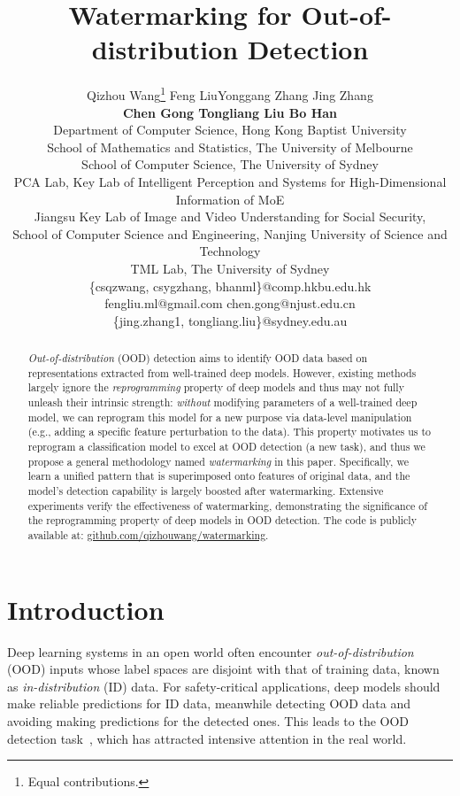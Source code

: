\documentclass{article}
\title{Watermarking for Out-of-distribution Detection}
\author{Qizhou Wang\thanks{Equal contributions.} \quad Feng Liu\footnotemark[1] \quad Yonggang Zhang \quad Jing Zhang \\ \textbf{Chen Gong \quad Tongliang Liu \quad Bo Han} \\
  Department of Computer Science, Hong Kong Baptist University \\
  School of Mathematics and Statistics, The University of Melbourne \\
  School of Computer Science, The University of Sydney \\
  PCA Lab, Key Lab of Intelligent Perception and Systems for High-Dimensional Information of MoE \\
  Jiangsu Key Lab of Image and Video Understanding for Social Security, \\
  School of Computer Science and Engineering, Nanjing University of Science and Technology\\
  TML Lab, The University of Sydney \\
  \textnormal{\{csqzwang, csygzhang, bhanml\}@comp.hkbu.edu.hk} \\ \textnormal{fengliu.ml@gmail.com} \quad
  \textnormal{chen.gong@njust.edu.cn}\\
  \textnormal{\{jing.zhang1, tongliang.liu\}@sydney.edu.au}
}
\begin{document}
\maketitle


\begin{abstract}
  \emph{Out-of-distribution} (OOD) detection aims to identify OOD data based on representations extracted from well-trained deep models. However, existing methods largely ignore the \emph{reprogramming} property of deep models and thus may not fully unleash their intrinsic strength: \emph{without} modifying parameters of a well-trained deep model, we can reprogram this model for a new purpose via data-level manipulation (e.g., adding a specific feature perturbation to the data). This property motivates us to reprogram a classification model to excel at OOD detection (a new task), and thus we propose a general methodology named \emph{watermarking} in this paper. Specifically, we learn a unified pattern that is superimposed onto features of original data, and the model's detection capability is largely boosted after watermarking. Extensive experiments verify the effectiveness of watermarking, demonstrating the significance of the reprogramming property of deep models in OOD detection. The code is publicly available at: \href{https://github.com/QizhouWang/watermarking}{{github.com/qizhouwang/watermarking}}.
\end{abstract}



\section{Introduction}

Deep learning systems in an open world often encounter \emph{out-of-distribution} (OOD) inputs whose label spaces are disjoint with that of training data, known as \emph{in-distribution} (ID) data. For safety-critical applications, deep models should make reliable predictions for ID data, meanwhile detecting OOD data and avoiding making predictions for the detected ones. This leads to the OOD detection task~\cite{lee2018simple,nalisnickdo19,RenLFSPDDL19,vernekar2019out}, which has attracted intensive attention in the real world. 
\end{document}

